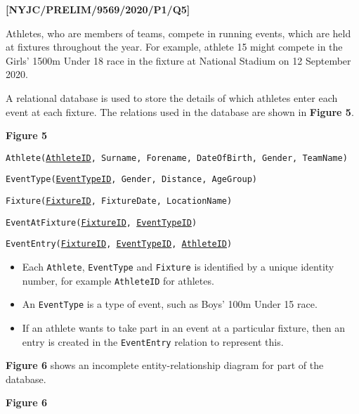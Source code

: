 \item \textbf{{[}NYJC/PRELIM/9569/2020/P1/Q5{]} }

Athletes, who are members of teams, compete in running events, which
are held at fixtures throughout the year. For example, athlete 15
might compete in the Girls\textquoteright{} 1500m Under 18 race in
the fixture at National Stadium on 12 September 2020.

A relational database is used to store the details of which athletes
enter each event at each fixture. The relations used in the database
are shown in \textbf{Figure 5}.
\noindent \begin{center}
\textbf{Figure 5}
\par\end{center}

\texttt{Athlete(}\texttt{\uline{AthleteID}}\texttt{, Surname, Forename,
DateOfBirth, Gender, TeamName) }

\texttt{EventType(}\texttt{\uline{EventTypeID}}\texttt{, Gender,
Distance, AgeGroup) }

\texttt{Fixture(}\texttt{\uline{FixtureID}}\texttt{, FixtureDate,
LocationName) }

\texttt{EventAtFixture(}\texttt{\uline{FixtureID}}\texttt{, }\texttt{\uline{EventTypeID}}\texttt{) }

\texttt{EventEntry(}\texttt{\uline{FixtureID}}\texttt{, }\texttt{\uline{EventTypeID}}\texttt{,
}\texttt{\uline{AthleteID}}\texttt{) }
\begin{itemize}
\item Each \texttt{Athlete}, \texttt{EventType} and \texttt{Fixture} is
identified by a unique identity number, for example \texttt{AthleteID}
for athletes. 
\item An \texttt{EventType} is a type of event, such as Boys\textquoteright{}
100m Under 15 race. 
\item If an athlete wants to take part in an event at a particular fixture,
then an entry is created in the \texttt{EventEntry} relation to represent
this. 
\end{itemize}
\textbf{Figure 6} shows an incomplete entity-relationship diagram
for part of the database. 
\noindent \begin{center}
\textbf{Figure 6}
\par\end{center}

